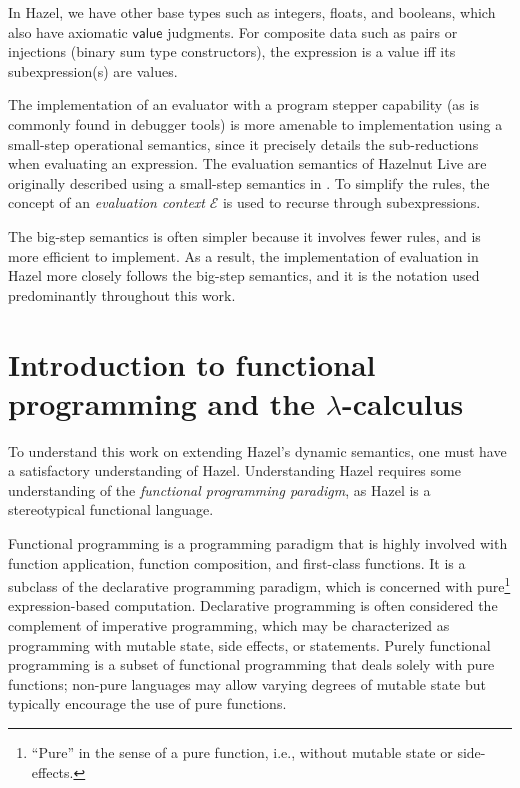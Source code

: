 In Hazel, we have other base types such as integers, floats, and booleans, which also have axiomatic $\textsf{value}$ judgments. For composite data such as pairs or injections (binary sum type constructors), the expression is a value iff its subexpression(s) are values.

The implementation of an evaluator with a program stepper capability (as is commonly found in debugger tools) is more amenable to implementation using a small-step operational semantics, since it precisely details the sub-reductions when evaluating an expression. The evaluation semantics of Hazelnut Live are originally described using a small-step semantics in \cite{conf/popl/HazelnutLive19}. To simplify the rules, the concept of an \textit{evaluation context} $\mathcal{E}$ is used to recurse through subexpressions.

The big-step semantics is often simpler because it involves fewer rules, and is more efficient to implement. As a result, the implementation of evaluation in Hazel more closely follows the big-step semantics, and it is the notation used predominantly throughout this work.

\section{Introduction to functional programming and the $\lambda$-calculus}
\label{sec:fp-lc}

To understand this work on extending Hazel's dynamic semantics, one must have a satisfactory understanding of Hazel. Understanding Hazel requires some understanding of the \textit{functional programming paradigm}, as Hazel is a stereotypical functional language. 

Functional programming \cite{hughes1989functional} is a programming paradigm that is highly involved with function application, function composition, and first-class functions. It is a subclass of the declarative programming paradigm, which is concerned with pure\footnote{``Pure'' in the sense of a pure function, i.e., without mutable state or side-effects.} expression-based computation. Declarative programming is often considered the complement of imperative programming, which may be characterized as programming with mutable state, side effects, or statements. Purely functional programming is a subset of functional programming that deals solely with pure functions; non-pure languages may allow varying degrees of mutable state but typically encourage the use of pure functions.

